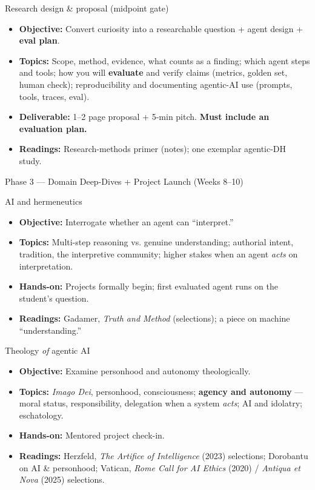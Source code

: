 \documentclass[11pt]{article}
\newcommand{\phase}[1]{%
  \vspace{0.8em}
  \noindent\colorbox{primary}{\parbox{\dimexpr\textwidth-2\fboxsep}{%
    \color{white}\bfseries\large\strut #1}}\par\vspace{0.5em}}
\newenvironment{week}[2]{%
  \vspace{0.4em}
  \noindent{\color{primary}\bfseries #1}\; #2\par\nobreak
  \begin{itemize}[leftmargin=1.4em,itemsep=1pt,topsep=2pt]}%
  {\end{itemize}}
\begin{document}
\begin{week}{Week 7}{Research design \& proposal \quad (midpoint gate)}
  \item \textbf{Objective:} Convert curiosity into a researchable question + agent design + \textbf{eval plan}.
  \item \textbf{Topics:} Scope, method, evidence, what counts as a finding; which agent steps and tools; how
    you will \textbf{evaluate} and verify claims (metrics, golden set, human check); reproducibility and
    documenting agentic-AI use (prompts, tools, traces, eval).
  \item \textbf{Deliverable:} 1--2 page proposal + 5-min pitch. \textbf{Must include an evaluation plan.}
  \item \textbf{Readings:} Research-methods primer (notes); one exemplar agentic-DH study.
\end{week}

\phase{Phase 3 --- Domain Deep-Dives + Project Launch (Weeks 8--10)}

\begin{week}{Week 8}{AI and hermeneutics}
  \item \textbf{Objective:} Interrogate whether an agent can ``interpret.''
  \item \textbf{Topics:} Multi-step reasoning vs. genuine understanding; authorial intent, tradition, the
    interpretive community; higher stakes when an agent \emph{acts} on interpretation.
  \item \textbf{Hands-on:} Projects formally begin; first evaluated agent runs on the student's question.
  \item \textbf{Readings:} Gadamer, \emph{Truth and Method} (selections); a piece on machine ``understanding.''
\end{week}

\begin{week}{Week 9}{Theology \emph{of} agentic AI}
  \item \textbf{Objective:} Examine personhood and autonomy theologically.
  \item \textbf{Topics:} \emph{Imago Dei}, personhood, consciousness; \textbf{agency and autonomy} --- moral status,
    responsibility, delegation when a system \emph{acts}; AI and idolatry; eschatology.
  \item \textbf{Hands-on:} Mentored project check-in.
  \item \textbf{Readings:} Herzfeld, \emph{The Artifice of Intelligence} (2023) selections; Dorobantu on AI \&
    personhood; Vatican, \emph{Rome Call for AI Ethics} (2020) / \emph{Antiqua et Nova} (2025) selections.
\end{week}
\end{document}
